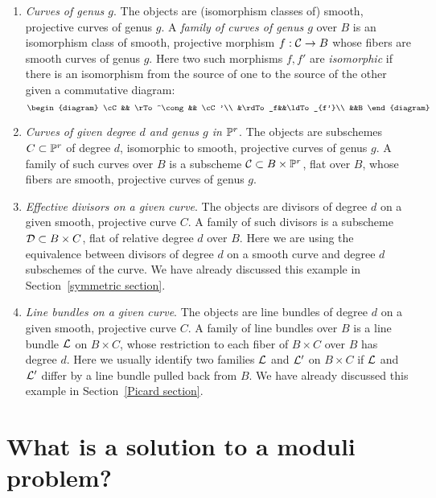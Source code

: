 \begin{enumerate}\label{list of moduli problems}
\item \emph{Curves of genus $g$}. The objects are (isomorphism classes of) smooth, projective curves of genus $g$. A \emph{family of curves of genus $g$} over $B$ is an isomorphism class of smooth, projective morphism $f : {\cal C} \to B$ whose fibers are  smooth curves of genus $g$. Here two such morphisms $f, f'$
are \emph{isomorphic} if there is an isomorphism from the source of one to the source
of the other given a commutative diagram:
$$
\begin{diagram}
\cC && \rTo^\cong && \cC'\\
&\rdTo_f&&\ldTo_{f'}\\
&&B
\end{diagram}
$$

\item \emph{Curves of given degree $d$ and genus $g$ in ${\mathbb P}^r$}. The objects are subschemes $C \subset {\mathbb P}^r$ of degree $d$, isomorphic to smooth, projective curves of genus $g$. A family of such curves over $B$ is a subscheme ${\cal C} \subset B \times {\mathbb P}^r$, flat over $B$,  whose fibers are smooth, projective curves of genus $g$.

\item \emph{Effective divisors on a given curve}. The objects are divisors of degree $d$ on a given smooth, projective curve $C$. A family of such divisors is a subscheme ${\cal D} \subset B \times C$, flat of relative degree $d$ over $B$. Here we are using
the equivalence between divisors of degree $d$ on a smooth curve and degree $d$ subschemes of the curve. We have already discussed this example in Section~\ref{symmetric section}.

\item \emph{Line bundles on a given curve}. The objects are line bundles of degree $d$ on a given smooth, projective curve $C$. A family of line bundles over $B$ is a line bundle ${\mathcal L}$ on $B \times C$, whose restriction to each fiber of $B \times C$ over $B$ has degree $d$. Here we usually identify two families ${\mathcal L}$ and ${\mathcal L}'$ on $B \times C$ if ${\mathcal L}$ and ${\mathcal L}'$ differ by a line
bundle pulled back from $B$. We have already discussed this example in Section~\ref{Picard section}.

\end{enumerate}

\section{What is a solution to a moduli problem?}

